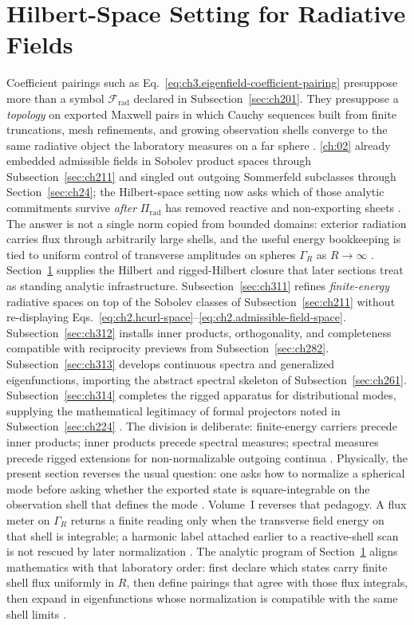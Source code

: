 \section{Hilbert-Space Setting for Radiative Fields}
\label{sec:ch31}
Coefficient pairings such as Eq.~\eqref{eq:ch3.eigenfield-coefficient-pairing} presuppose more than a
symbol \(\mathcal{F}_{\mathrm{rad}}\) declared in Subsection~\ref{sec:ch201}. They presuppose a
\emph{topology} on exported Maxwell pairs in which Cauchy sequences built from finite truncations,
mesh refinements, and growing observation shells converge to the same radiative object the laboratory
measures on a far sphere \cite{stratton1941}. \ref{ch:02} already embedded
admissible fields in Sobolev product spaces through Subsection~\ref{sec:ch211} and singled out outgoing
Sommerfeld subclasses through Section~\ref{sec:ch24}; the Hilbert-space setting now asks which of those
analytic commitments survive \emph{after} \(\Pi_{\mathrm{rad}}\) has removed reactive and non-exporting
sheets \cite{stratton1941}. The answer is not a single norm copied from bounded domains: exterior
radiation carries flux through arbitrarily large shells, and the useful energy bookkeeping is tied to
uniform control of transverse amplitudes on spheres \(\Gamma_R\) as \(R\to\infty\)
\cite{stratton1941}.
Section~\ref{sec:ch31} supplies the Hilbert and rigged-Hilbert closure that later sections treat as
standing analytic infrastructure. Subsection~\ref{sec:ch311} refines \emph{finite-energy} radiative
spaces on top of the Sobolev classes of Subsection~\ref{sec:ch211} without re-displaying
Eqs.~\eqref{eq:ch2.hcurl-space}--\eqref{eq:ch2.admissible-field-space}. Subsection~\ref{sec:ch312}
installs inner products, orthogonality, and completeness compatible with reciprocity previews from
Subsection~\ref{sec:ch282}. Subsection~\ref{sec:ch313} develops continuous spectra and generalized
eigenfunctions, importing the abstract spectral skeleton of Subsection~\ref{sec:ch261}. Subsection~\ref{sec:ch314}
completes the rigged apparatus for distributional modes, supplying the mathematical legitimacy of formal
projectors noted in Subsection~\ref{sec:ch224} \cite{stratton1941}. The division is
deliberate: finite-energy carriers precede inner products; inner products precede spectral measures;
spectral measures precede rigged extensions for non-normalizable outgoing continua
\cite{stratton1941}.
Physically, the present section reverses the usual question: one asks how to
normalize a spherical mode before asking whether the exported state is square-integrable on the
observation shell that defines the mode \cite{harrington2001}. Volume~I reverses that pedagogy. A flux
meter on \(\Gamma_R\) returns a finite reading only when the transverse field energy on that shell is
integrable; a harmonic label attached earlier to a reactive-shell scan is not rescued by later
normalization \cite{stratton1941}. The analytic program of Section~\ref{sec:ch31} aligns mathematics with
that laboratory order: first declare which states carry finite shell flux uniformly in \(R\), then define
pairings that agree with those flux integrals, then expand in eigenfunctions whose normalization is
compatible with the same shell limits \cite{poynting1884}.
